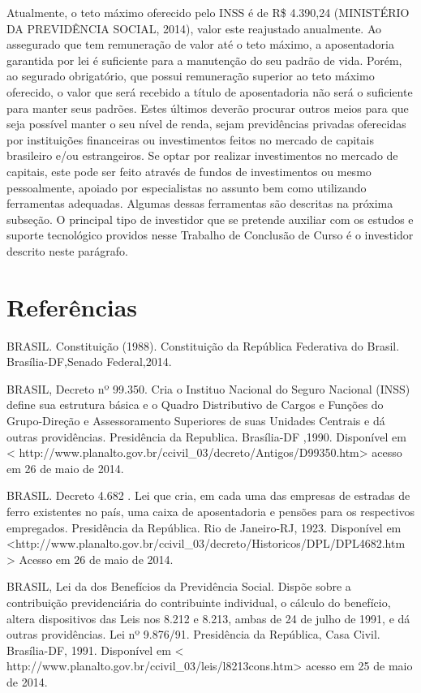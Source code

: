 \begin{apendicesenv}
Atualmente, o teto máximo oferecido pelo INSS é de R\$ 4.390,24 (MINISTÉRIO DA PREVIDÊNCIA SOCIAL, 2014), valor este reajustado anualmente. Ao assegurado que tem remuneração de valor até o teto máximo, a aposentadoria garantida por lei é suficiente para a manutenção do seu padrão de vida. Porém, ao segurado obrigatório, que possui remuneração superior ao teto máximo oferecido, o valor que será recebido a título de aposentadoria não será o suficiente para manter seus padrões. Estes últimos deverão procurar outros meios para que seja possível manter o seu nível de renda, sejam previdências privadas oferecidas por instituições financeiras ou investimentos feitos no mercado de capitais brasileiro e/ou estrangeiros. Se optar por realizar investimentos no mercado de capitais, este pode ser feito através de fundos de investimentos ou mesmo pessoalmente, apoiado por especialistas no assunto bem como utilizando ferramentas adequadas. Algumas dessas ferramentas são descritas na próxima subseção. O principal tipo de investidor que se pretende auxiliar com os estudos e suporte tecnológico providos nesse Trabalho de Conclusão de Curso é o investidor descrito neste parágrafo.

\section*{Referências}

BRASIL. Constituição (1988). Constituição da República Federativa do Brasil. Brasília-DF,Senado Federal,2014.

BRASIL, Decreto nº 99.350. Cria o Instituo Nacional do Seguro Nacional (INSS) define sua estrutura básica e o Quadro Distributivo de Cargos e Funções do Grupo-Direção e Assessoramento Superiores de suas Unidades Centrais e dá outras providências. Presidência da Republica. Brasília-DF ,1990. Disponível em < http://www.planalto.gov.br/ccivil\_03/decreto/Antigos/D99350.htm> acesso em 26 de maio de 2014.

BRASIL. Decreto 4.682 . Lei que cria, em cada uma das empresas de estradas de ferro existentes no país, uma caixa de aposentadoria e pensões para os respectivos empregados. Presidência da República. Rio de Janeiro-RJ, 1923. Disponível em <http://www.planalto.gov.br/ccivil\_03/decreto/Historicos/DPL/DPL4682.htm > Acesso em 26 de maio de 2014.

BRASIL, Lei da dos Benefícios da Previdência Social. Dispõe sobre a contribuição previdenciária do contribuinte individual, o cálculo do benefício, altera dispositivos das Leis nos 8.212 e 8.213, ambas de 24 de julho de 1991, e dá outras providências. Lei nº 9.876/91. Presidência da República, Casa Civil. Brasília-DF, 1991. Disponível em < http://www.planalto.gov.br/ccivil\_03/leis/l8213cons.htm> acesso em 25 de maio de 2014.


\end{apendicesenv}
